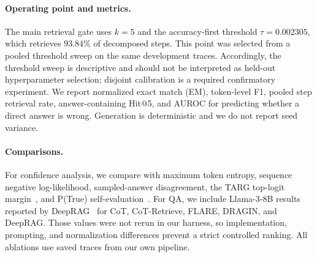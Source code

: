 \paragraph{Operating point and metrics.}
The main retrieval gate uses \(k=5\) and the accuracy-first threshold
\(\tau=0.002305\), which retrieves \(93.84\%\) of decomposed steps. This point
was selected from a pooled threshold sweep on the same development traces.
Accordingly, the threshold sweep is descriptive and should not be interpreted
as held-out hyperparameter selection; disjoint calibration is a required
confirmatory experiment. We report normalized exact match (EM), token-level
F1, pooled step retrieval rate, answer-containing Hit@5, and AUROC for
predicting whether a direct answer is wrong. Generation is deterministic and
we do not report seed variance.

\paragraph{Comparisons.}
For confidence analysis, we compare \tailleak{} with maximum token entropy,
sequence negative log-likelihood, sampled-answer disagreement, the TARG
top-logit margin~\citep{targ}, and P(True) self-evaluation~\citep{kadavath2022}.
For QA, we include Llama-3-8B results reported by DeepRAG~\citep{deeprag} for
CoT, CoT-Retrieve, FLARE, DRAGIN, and DeepRAG. Those values were not rerun in
our harness, so implementation, prompting, and normalization differences
prevent a strict controlled ranking. All \method{} ablations use saved traces
from our own pipeline.
